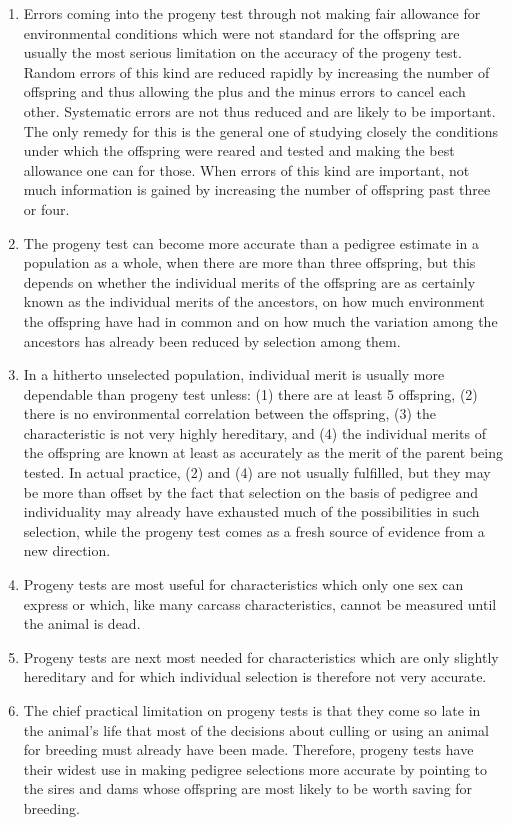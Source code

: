 \begin{enumerate}
\item Errors coming into the progeny test through not making fair
allowance for environmental conditions which were not standard for
the offspring are usually the most serious limitation on the accuracy of
the progeny test. Random errors of this kind are reduced rapidly by
increasing the number of offspring and thus allowing the plus and the
minus errors to cancel each other. Systematic errors are not thus reduced
and are likely to be important. The only remedy for this is the general
one of studying closely the conditions under which the offspring were
reared and tested and making the best allowance one can for those.
When errors of this kind are important, not much information is
gained by increasing the number of offspring past three or four.

\item The progeny test can become more accurate than a pedigree estimate
in a population as a whole, when there are more than three offspring,
but this depends on whether the individual merits of the offspring
are as certainly known as the individual merits of the ancestors,
on how much environment the offspring have had in common and on
how much the variation among the ancestors has already been reduced
by selection among them.

\item In a hitherto unselected population, individual merit is usually
more dependable than progeny test unless: (1) there are at least 5 offspring,
(2) there is no environmental correlation between the offspring,
(3) the characteristic is not very highly hereditary, and (4) the individual
merits of the offspring are known at least as accurately as the merit of
the parent being tested. In actual practice, (2) and (4) are not usually
fulfilled, but they may be more than offset by the fact that selection on
the basis of pedigree and individuality may already have exhausted
much of the possibilities in such selection, while the progeny test comes
as a fresh source of evidence from a new direction.

\item Progeny tests are most useful for characteristics which only one
sex can express or which, like many carcass characteristics, cannot be
measured until the animal is dead.

\item Progeny tests are next most needed for characteristics which are
only slightly hereditary and for which individual selection is therefore
not very accurate.

\item The chief practical limitation on progeny tests is that they come
so late in the animal's life that most of the decisions about culling or
using an animal for breeding must already have been made. Therefore,
progeny tests have their widest use in making pedigree selections more
accurate by pointing to the sires and dams whose offspring are most
likely to be worth saving for breeding.
\end{enumerate}
